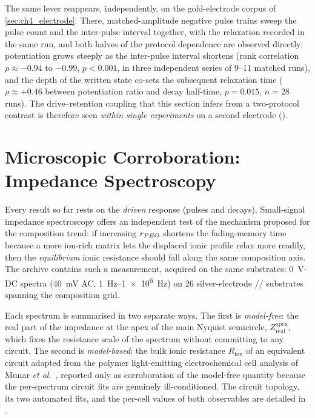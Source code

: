 \documentclass[12pt, twoside]{report}
\begin{document}
The same lever reappears, independently, on the gold-electrode corpus of \cref{sec:ch4_electrode}. There, matched-amplitude negative pulse trains sweep the pulse count and the inter-pulse interval together, with the relaxation recorded in the same run, and both halves of the protocol dependence are observed directly: potentiation grows steeply as the inter-pulse interval shortens (rank correlation \(\rho\approx-0.94\) to \(-0.99\), \(p<0.001\), in three independent series of \numrange{9}{11} matched runs), and the depth of the written state co-sets the subsequent relaxation time (\(\rho\approx+0.46\) between potentiation ratio and decay half-time, \(p=0.015\), \(n=28\) runs). The drive--retention coupling that this section infers from a two-protocol contrast is therefore seen \emph{within single experiments} on a second electrode ().

\section{Microscopic Corroboration: Impedance Spectroscopy}\label{sec:ch4_eis}

Every result so far rests on the \emph{driven} response (pulses and decays). Small-signal impedance spectroscopy offers an independent test of the mechanism proposed for the composition trend: if increasing \(r_{PEO{}}\) shortens the fading-memory time because a more ion-rich matrix lets the displaced ionic profile relax more readily, then the \emph{equilibrium} ionic resistance should fall along the same composition axis. The archive contains such a measurement, acquired on the same substrates: \SI{0}{\volt}-DC spectra (\SI{40}{\milli\volt} AC, \SIrange{1}{1e6}{\hertz}) on \num{26} silver-electrode \SY{}/\PEO{}/\LiTf{} substrates spanning the composition grid.

Each spectrum is summarised in two separate ways. The first is \emph{model-free}: the real part of the impedance at the apex of the main Nyquist semicircle, \(Z_{\mathrm{real}}^{\mathrm{apex}}\), which fixes the resistance scale of the spectrum without committing to any circuit. The second is \emph{model-based}: the bulk ionic resistance \(R_{\mathrm{ion}}\) of an equivalent circuit adapted from the polymer light-emitting electrochemical cell analysis of Munar \textit{et al.}~\cite{Munar2012}, reported only as corroboration of the model-free quantity because the per-spectrum circuit fits are genuinely ill-conditioned. The circuit topology, its two automated fits, and the per-cell values of both observables are detailed in .
\end{document}
